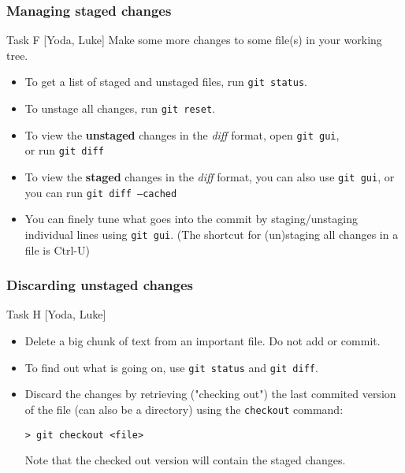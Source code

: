 \begin{frame}

\frametitle{Managing staged changes}

	\begin{block}{Task F [Yoda, Luke]}
	Make some more changes to some file(s) in your working tree.
	\end{block}
	\begin{itemize}	
	
	\item To get a list of staged and unstaged files, run \texttt{git status}.
	\item To unstage all changes, run \texttt{git reset}.
	\item To view the \textbf{unstaged} changes in the \textit{diff} format, open \texttt{git gui}, 
	\\or run \texttt{git diff}

	\item To view the \textbf{staged} changes in the \textit{diff} format, you can also use \texttt{git gui}, or you can run \texttt{git diff --cached}
	
	\item You can finely tune what goes into the commit by staging/unstaging individual lines using \texttt{git gui}.
	(The shortcut for (un)staging all changes in a file is Ctrl-U)
	\end{itemize}
	
\end{frame}



\begin{frame}[fragile]
	\frametitle{Discarding unstaged changes}
	
	\begin{block}{Task H [Yoda, Luke]}
	\begin{itemize}
	\item Delete a big chunk of text from an important file. Do not add or commit.
	
	\item To find out what is going on, use \texttt{git status} and \texttt{git diff}.
	\medskip	
    \item Discard the changes by retrieving ("checking out") the last commited version of the file (can also be a directory) using the \texttt{checkout} command:

	\begin{verbatim}
> git checkout <file>
	\end{verbatim}
	
	Note that the checked out version will contain the staged changes.
	\end{itemize}	
	\end{block}
\end{frame}

